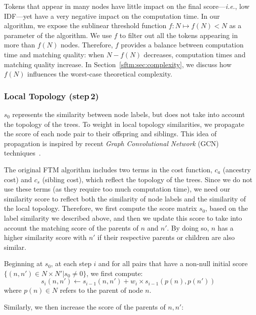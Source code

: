 Tokens that appear in many nodes have little impact on the final score---\emph{i.e.}, low IDF---yet have a very negative impact on the computation time.
In our algorithm, we expose the sublinear threshold function $f: N \mapsto f(N) < N$ as a parameter of the algorithm.
We use $f$ to filter out all the tokens appearing in more than $f(N)$ nodes.
Therefore, $f$ provides a balance between computation time and matching quality: when $N-f(N)$ decreases, computation times and matching quality increase.
In Section~\ref{sftm:sec:complexity}, we discuss how $f(N)$ influences the worst-case theoretical complexity.

\subsubsection{Local Topology (step\,2)}
$s_{0}$ represents the similarity between node labels, but does not take into account the topology of the trees.
To weight in local topology similarities, we propagate the score of each node pair to their offspring and siblings.
This idea of propagation is inspired by recent \emph{Graph Convolutional Network} (GCN) techniques~\cite{kipf2016semi}.

The original FTM algorithm includes two terms in the cost function, $c_a$ (ancestry cost) and $c_s$ (sibling cost), which reflect the topology of the trees.
Since we do not use these terms (as they require too much computation time), we need our similarity score to reflect both the similarity of node labels and the similarity of the local topology.
Therefore, we first compute the score matrix $s_0$, based on the label similarity we described above, and then we update this score to take into account the matching score of the parents of $n$ and $n'$.
By doing so, $n$ has a higher similarity score with $n'$ if their respective parents or children are also similar.

Beginning at $s_0$, at each step $i$ and for all pairs that have a non-null initial score  $\{(n, n')\in N \times N' | s_0 \neq 0\}$, we first compute:
\begin{equation}\label{eq:score}
	s_{i}(n, n') \gets s_{i-1}(n, n') +  w_i \times s_{i-1}(p(n), p(n'))
\end{equation}
where $p(n) \in N$ refers to the parent of node $n$.

Similarly, we then increase the score of the parents of $n, n'$:

